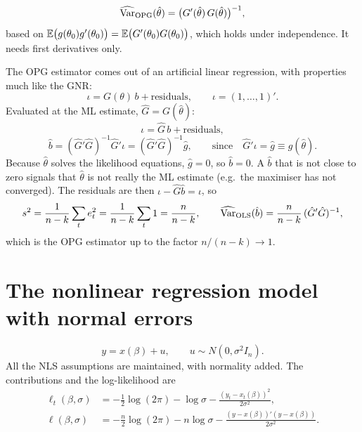 \documentclass[11pt]{article}
\begin{document}
\[ \widehat{\operatorname{Var}}_{\mathrm{OPG}}(\hat\theta)=\bigl(G'(\hat\theta)\,G(\hat\theta)\bigr)^{-1}, \]
based on $\mathbb{E}\bigl(g(\theta_{0})g'(\theta_{0})\bigr)=\mathbb{E}\bigl(G'(\theta_{0})G(\theta_{0})\bigr)$, which holds under independence.
It needs first derivatives only.

The OPG estimator comes out of an artificial linear regression, with properties much like
the GNR:
\begin{equation}\tag{1}
 \iota=G(\theta)\,b+\text{residuals}, \qquad \iota=(1,\ldots,1)' .
\end{equation}
Evaluated at the ML estimate, $\hat G=G(\hat\theta)$:
\begin{equation}\tag{2}
 \iota=\hat G\,b+\text{residuals},
\end{equation}
\begin{equation}\tag{3}
 \hat b=(\hat G'\hat G)^{-1}\hat G'\iota=(\hat G'\hat G)^{-1}\hat g,
 \qquad\text{since}\quad \hat G'\iota=\hat g\equiv g(\hat\theta).
\end{equation}
Because $\hat\theta$ solves the likelihood equations, $\hat g=0$, so $\hat b=0$. A $\hat b$ that is not
close to zero signals that $\hat\theta$ is not really the ML estimate (e.g.\ the maximiser has not
converged). The residuals are then $\iota-\hat G\hat b=\iota$, so
\[ s^{2}=\frac{1}{n-k}\sum_{t}e_{t}^{2}=\frac{1}{n-k}\sum_{t}1=\frac{n}{n-k},
   \qquad
   \widehat{\operatorname{Var}}_{\text{OLS}}(\hat b)=\frac{n}{n-k}\,(\hat G'\hat G)^{-1}, \]
which is the OPG estimator up to the factor $n/(n-k)\to1$.

\section{The nonlinear regression model with normal errors}

\begin{equation}\tag{4}
 y=x(\beta)+u, \qquad u\sim N(0,\sigma^{2}I_{n}).
\end{equation}
All the NLS assumptions are maintained, with normality added. The contributions and the
log-likelihood are
\begin{align*}
 \ell_{t}(\beta,\sigma)&=-\tfrac12\log(2\pi)-\log\sigma-\frac{(y_{t}-x_{t}(\beta))^{2}}{2\sigma^{2}}, \tag{5}\\
 \ell(\beta,\sigma)&=-\tfrac n2\log(2\pi)-n\log\sigma-\frac{(y-x(\beta))'(y-x(\beta))}{2\sigma^{2}}. \tag{6}
\end{align*}
\end{document}

